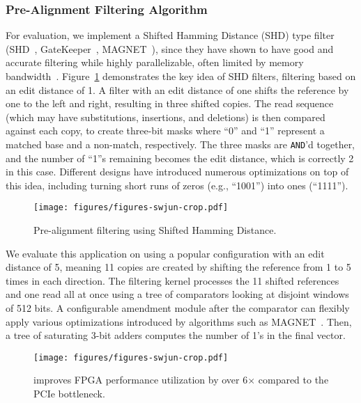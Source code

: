 \subsubsection{Pre-Alignment Filtering Algorithm}
For evaluation, we implement a Shifted Hamming Distance (SHD) type filter (SHD~\cite{xin2015shiftedhammingdistance}, GateKeeper~\cite{alser2017gatekeeper,bingol2024gatekeepergpu}, MAGNET~\cite{alser2017magnet}), since they have shown to have good and accurate filtering while highly parallelizable, often limited by memory bandwidth~\cite{alser2017gatekeeper}.
Figure~\ref{fig:shd} demonstrates the key idea of SHD filters, filtering based on an edit distance of 1.
A filter with an edit distance of one shifts the reference by one to the left and right, resulting in three shifted copies.
The read sequence (which may have substitutions, insertions, and deletions) is then compared against each copy, to create three-bit masks where ``0'' and ``1'' represent a matched base and a non-match, respectively.
The three masks are \texttt{AND}'d together, and the number of ``1''s remaining becomes the edit distance, which is correctly 2 in this case.
Different designs have introduced numerous optimizations on top of this idea, including turning short runs of zeros (e.g., ``1001'') into ones (``1111'').

\begin{figure}[htb]
    \centering
    \texttt{[image: figures/figures-swjun-crop.pdf]}
    \caption{Pre-alignment filtering using Shifted Hamming Distance.}
    \label{fig:shd}
\end{figure}

We evaluate this application on \name{} using a popular configuration with an edit distance of 5, meaning 11 copies are created by shifting the reference from 1 to 5 times in each direction.
The filtering kernel processes the 11 shifted references and one read all at once using a tree of comparators looking at disjoint windows of 512 bits.
A configurable amendment module after the comparator can flexibly apply various optimizations introduced by algorithms such as MAGNET~\cite{alser2017magnet}.
Then, a tree of saturating 3-bit adders computes the number of 1's in the final vector.

\begin{figure}[htb]
    \centering
    \texttt{[image: figures/figures-swjun-crop.pdf]}
    \caption{\name{} improves FPGA performance utilization by over 6$\times$ compared to the PCIe bottleneck.}
    \label{fig:filtering_performance}
\end{figure}

